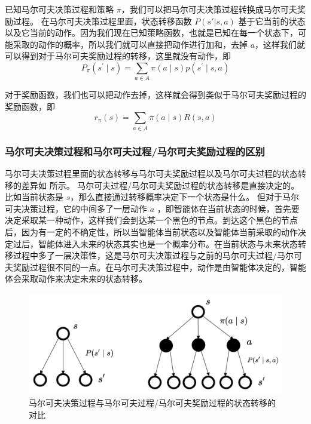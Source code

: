 已知马尔可夫决策过程和策略 $\pi$，我们可以把马尔可夫决策过程转换成马尔可夫奖励过程。
在马尔可夫决策过程里面，状态转移函数 $P(s'|s,a)$ 基于它当前的状态以及它当前的动作。因为我们现在已知策略函数，也就是已知在每一个状态下，可能采取的动作的概率，所以我们就可以直接把动作进行加和，去掉 $a$，这样我们就可以得到对于马尔可夫奖励过程的转移，这里就没有动作，即
\begin{equation}
  P_{\pi}\left(s^{\prime} \mid s\right)=\sum_{a \in A} \pi(a \mid s) p\left(s^{\prime} \mid s, a\right)
  \label{eq:}
\end{equation}

对于奖励函数，我们也可以把动作去掉，这样就会得到类似于马尔可夫奖励过程的奖励函数，即
\begin{equation}
  r_{\pi}(s)=\sum_{a \in A} \pi(a \mid s) R(s, a)
  \label{eq:}
\end{equation}

\subsubsection{马尔可夫决策过程和马尔可夫过程/马尔可夫奖励过程的区别} 
马尔可夫决策过程里面的状态转移与马尔可夫奖励过程以及马尔可夫过程的状态转移的差异如 所示。
马尔可夫过程/马尔可夫奖励过程的状态转移是直接决定的。比如当前状态是 $s$，那么直接通过转移概率决定下一个状态是什么。
但对于马尔可夫决策过程，它的中间多了一层动作 $a$ ，即智能体在当前状态的时候，首先要决定采取某一种动作，这样我们会到达某一个黑色的节点。到达这个黑色的节点后，因为有一定的不确定性，所以当智能体当前状态以及智能体当前采取的动作决定过后，智能体进入未来的状态其实也是一个概率分布。在当前状态与未来状态转移过程中多了一层决策性，这是马尔可夫决策过程与之前的马尔可夫过程/马尔可夫奖励过程很不同的一点。在马尔可夫决策过程中，动作是由智能体决定的，智能体会采取动作来决定未来的状态转移。

\begin{figure}[hbt]
  \centering
  \includegraphics[width=0.6\linewidth]{ch2/figs/2.21.png}
  \caption{马尔可夫决策过程与马尔可夫过程/马尔可夫奖励过程的状态转移的对比}
  \label{fig:fig2.21}
\end{figure}
